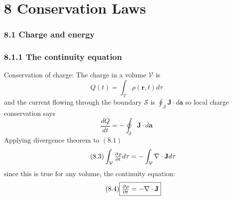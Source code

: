 \documentclass[10pt,a4paper]{article}
\theoremstyle{break}
\begin{document}
  \section*{8 Conservation Laws}
    \subsubsection*{8.1 Charge and energy}
      \subsubsection*{8.1.1 The continuity equation}
        Conservation of charge: \newline
          The charge in a volume $\mathcal{V}$ is
            \begin{equation}\tag{8.1}
              Q(t) = \int_{\mathcal{V}} \rho(\textbf{r},t)d\tau
            \end{equation}
          and the current flowing through the boundary $\mathcal{S}$ is $\oint_{\mathcal{S}}\textbf{J}\cdot d\mathbf{a}$ so local charge conservation says
            \begin{equation}\tag{8.2}
              \frac{dQ}{dt} = -\oint_{\mathcal{S}}\mathbf{J}\cdot d \mathbf{a}
            \end{equation}
          Applying divergence theorem to $(8.1)$
            \begin{equation}\tag{8.3}
              \int_{\mathcal{V}}\pd\rho td\tau = - \int_{\mathcal{V}}\nabla \cdot \mathbf{J}d\tau
            \end{equation}
          since this is true for any volume, the continuity equation:
            \begin{equation}\tag{8.4}
              \boxed{\pd \rho t = -\nabla \cdot \mathbf{J}}
            \end{equation}
\end{document}
